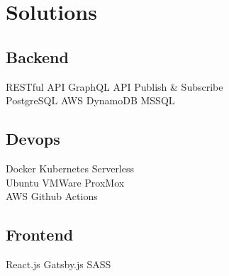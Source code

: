 \documentclass[]{bw-resume}
\begin{document}
%
%
\lastupdated

%
%

%
%

\begin{minipage}[t]{0.33\textwidth} 


\section{Solutions}

\subsection{Backend}
RESTful API \textbullet{} GraphQL API \textbullet{} \newline Publish \& Subscribe \\
\locationsep
{}
PostgreSQL \textbullet{} AWS DynamoDB \textbullet{} \newline MSSQL \\
\subsectionsep

\subsection{Devops}
Docker \textbullet{}   Kubernetes \textbullet{} Serverless \\ 
\locationsep
{}
Ubuntu \textbullet{} VMWare \textbullet{} ProxMox \\
\locationsep
{}
AWS \textbullet{} Github Actions \\
\subsectionsep

\subsection{Frontend}
React.js \textbullet{}   Gatsby.js \textbullet{} SASS \\ 



\end{minipage}
\end{document}

